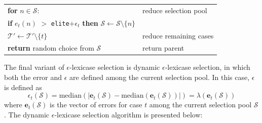 \documentclass[twoside]{article}
\begin{document}
\begin{algorithm}
{\begin{tabularx}{\textwidth}{lX}
\hspace{1em}\hspace{1em}	\textbf{for} $n \in \mathcal{S}$: 	&	\hspace{1em}reduce selection pool\\
\hspace{1em}\hspace{1em}\hspace{1em}	 \textbf{if} $e_t(n)$ $>$ \texttt{elite}$+\epsilon_{t}$ \textbf{then}	$\mathcal{S} \leftarrow \mathcal{S} \setminus \{n\}$	 \\
\hspace{1em}\hspace{1em}	$\mathcal{T'} \leftarrow \mathcal{T'} \setminus \{t\}$				&	\hspace{1em}reduce remaining cases\\
\hspace{1em} \textbf{return} random choice from $\mathcal{S}$															&	return parent  
\end{tabularx}
}
\end{algorithm}

The final variant of $\epsilon$-lexicase selection is dynamic $\epsilon$-lexicase selection, in which both the error and $\epsilon$ are defined among the current selection pool. In this case, $\epsilon$ is defined as 
\begin{equation}\label{eq:epd}
\epsilon_t(\mathcal{S}) = \text{median}(|\mathbf{e}_t(\mathcal{S}) - \text{median}(\mathbf{e}_t(\mathcal{S}))|) = \lambda(\mathbf{e}_t(\mathcal{S}))
\end{equation}
where $\mathbf{e}_t(\mathcal{S})$ is the vector of errors for case $t$ among the current selection pool $\mathcal{S}$. The dynamic $\epsilon$-lexicase selection algorithm is presented below:
\end{document}
